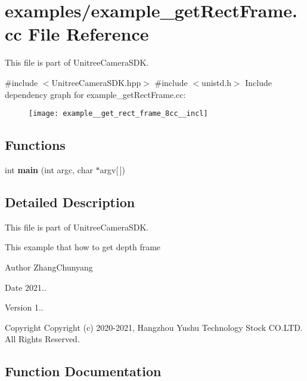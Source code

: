 \section{examples/example\+\_\+get\+Rect\+Frame.cc File Reference}
\label{example__get_rect_frame_8cc}


This file is part of Unitree\+Camera\+S\+DK.  


{\ttfamily \#include $<$Unitree\+Camera\+S\+D\+K.\+hpp$>$}\newline
{\ttfamily \#include $<$unistd.\+h$>$}\newline
Include dependency graph for example\+\_\+get\+Rect\+Frame.\+cc\+:\nopagebreak
\begin{figure}[H]
\begin{center}
\leavevmode
\texttt{[image: example\_\_get\_rect\_frame\_8cc\_\_incl]}
\end{center}
\end{figure}
\subsection*{Functions}
\begin{DoxyCompactItemize}
\item 
int \textbf{ main} (int argc, char $\ast$argv[$\,$])
\end{DoxyCompactItemize}


\subsection{Detailed Description}
This file is part of Unitree\+Camera\+S\+DK. 

This example that how to get depth frame \begin{DoxyAuthor}{Author}
Zhang\+Chunyang 
\end{DoxyAuthor}
\begin{DoxyDate}{Date}
2021.. 
\end{DoxyDate}
\begin{DoxyVersion}{Version}
1.. 
\end{DoxyVersion}
\begin{DoxyCopyright}{Copyright}
Copyright (c) 2020-\/2021, Hangzhou Yushu Technology Stock C\+O.\+L\+TD. All Rights Reserved. 
\end{DoxyCopyright}


\subsection{Function Documentation}
\mbox{\label{example__get_rect_frame_8cc_a0ddf1224851353fc92bfbff6f499fa97}} 
